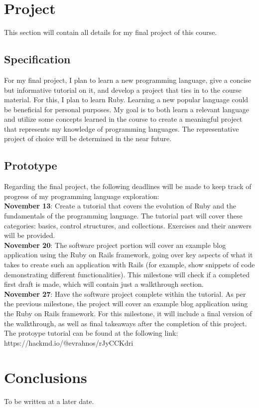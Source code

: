 \documentclass{article}
\theoremstyle{theorem}
\theoremstyle{definition}
\theoremstyle{remark}
\begin{document}
\section{Project}
This section will contain all details for my final project of this course.
\subsection{Specification}
For my final project, I plan to learn a new programming language, give a concise but informative tutorial on it, and develop a project that ties in to the course material. For this, I plan to learn Ruby. Learning a new popular language could be beneficial for personal purposes. My goal is to both learn a relevant language and utilize some concepts learned in the course to create a meaningful project that represents my knowledge of programming languages. The representative project of choice will be determined in the near future.
\subsection{Prototype}
Regarding the final project, the following deadlines will be made to keep track of progress of my programming language exploration:\\

\noindent \textbf{November 13}: Create a tutorial that covers the evolution of Ruby and the fundamentals of the programming language. The tutorial part will cover these categories: basics, control structures, and collections. Exercises and their answers will be provided.\\

\noindent \textbf{November 20}: The software project portion will cover an example blog application using the Ruby on Rails framework, going over key aspects of what it takes to create such an application with Rails (for example, show snippets of code demonstrating different functionalities). This milestone will check if a completed first draft is made, which will contain just a walkthrough section. \\

\noindent \textbf{November 27}: Have the software project complete within the tutorial. As per the previous milestone, the project will cover an example blog application using the Ruby on Rails framework. For this milestone, it will include a final version of the walkthrough, as well as  final takeaways after the completion of this project.\\

\noindent The protoype tutorial can be found at the following link: https://hackmd.io/@evrahnos/rJyCCKdri

\section{Conclusions}\label{conclusions}

To be written at a later date.
\end{document}
